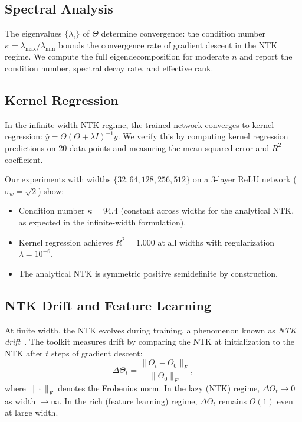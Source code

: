\documentclass[10pt]{article}
\theoremstyle{definition}
\begin{document}
\subsection{Spectral Analysis}

The eigenvalues $\{\lambda_i\}$ of $\Theta$ determine convergence:
the condition number $\kappa = \lambda_{\max}/\lambda_{\min}$ bounds the convergence rate of gradient descent in the NTK regime.
We compute the full eigendecomposition for moderate $n$ and report the condition number, spectral decay rate, and effective rank.

\subsection{Kernel Regression}

In the infinite-width NTK regime, the trained network converges to kernel regression: $\hat{y} = \Theta (\Theta + \lambda I)^{-1} y$.
We verify this by computing kernel regression predictions on 20 data points and measuring the mean squared error and $R^2$ coefficient.

Our experiments with widths $\{32, 64, 128, 256, 512\}$ on a 3-layer ReLU network ($\sigma_w = \sqrt{2}$) show:
\begin{itemize}[nosep]
  \item Condition number $\kappa = 94.4$ (constant across widths for the analytical NTK, as expected in the infinite-width formulation).
  \item Kernel regression achieves $R^2 = 1.000$ at all widths with regularization $\lambda = 10^{-6}$.
  \item The analytical NTK is symmetric positive semidefinite by construction.
\end{itemize}

\subsection{NTK Drift and Feature Learning}

At finite width, the NTK evolves during training, a phenomenon known as \emph{NTK drift}~\citep{yang2021tensor}.
The toolkit measures drift by comparing the NTK at initialization to the NTK after $t$ steps of gradient descent:
\begin{equation}
  \Delta\Theta_t = \frac{\|\Theta_t - \Theta_0\|_F}{\|\Theta_0\|_F},
\end{equation}
where $\|\cdot\|_F$ denotes the Frobenius norm.
In the lazy (NTK) regime, $\Delta\Theta_t \to 0$ as width $\to \infty$.
In the rich (feature learning) regime, $\Delta\Theta_t$ remains $O(1)$ even at large width.
\end{document}
